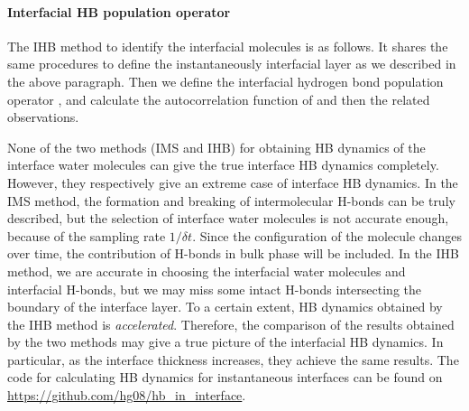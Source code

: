 \paragraph{Interfacial HB population operator \hbos} 
The IHB method to identify the interfacial molecules is as follows. 
It shares the same procedures to define the instantaneously interfacial layer as we described in the above paragraph.
Then we define the interfacial hydrogen bond population operator \hbos,
and calculate the autocorrelation function of \hbos and then the related observations. 


None of the two methods (IMS and IHB) for obtaining HB dynamics of the interface water molecules 
can give the true interface HB dynamics completely. However, they respectively give an extreme case of interface HB dynamics. 
In the IMS method, the formation and breaking of intermolecular H-bonds can be truly described, 
but the selection of interface water molecules is not accurate enough, because of the sampling rate $1/{\delta t}$. 
Since the configuration of the molecule changes over time, 
the contribution of H-bonds in bulk phase will be included. 
In the IHB method, we are accurate in choosing the interfacial water molecules and interfacial H-bonds, 
but we may miss some intact H-bonds intersecting the boundary of the interface layer. 
To a certain extent, HB dynamics obtained by the IHB method is \emph{accelerated}. 
Therefore, the comparison of the results obtained by the two methods may give a true picture of the interfacial HB dynamics.
In particular, as the interface thickness increases, they achieve the same results.
The code for calculating HB dynamics for instantaneous interfaces can be found on \url{https://github.com/hg08/hb_in_interface}. 

